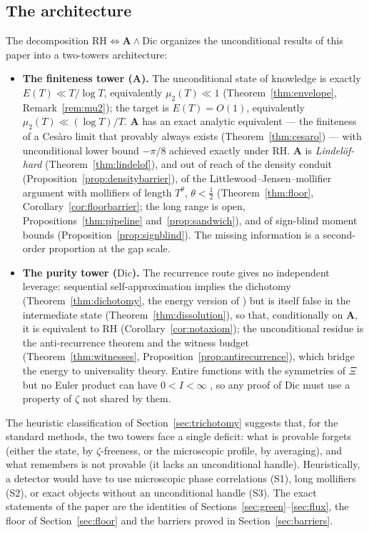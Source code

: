\documentclass[11pt]{amsart}
\theoremstyle{plain}
\theoremstyle{definition}
\theoremstyle{remark}
\newcommand{\RH}{\mathrm{RH}}
\newcommand{\Dic}{\mathrm{Dic}}
\newcommand{\Aax}{\mathbf{A}}
\begin{document}
\subsection{The architecture}

The decomposition $\RH\iff\Aax\wedge\Dic$ organizes the unconditional results of this paper into a two-towers architecture:

\begin{itemize}
\item \textbf{The finiteness tower ($\Aax$).} The unconditional state of knowledge is exactly $E(T)\ll T/\log T$, equivalently $\mu_2(T)\ll1$ (Theorem~\ref{thm:envelope}, Remark~\ref{rem:mu2}); the target is $E(T)=O(1)$, equivalently $\mu_2(T)\ll(\log T)/T$. $\Aax$ has an exact analytic equivalent --- the finiteness of a Ces\`aro limit that provably always exists (Theorem~\ref{thm:cesaro}) --- with unconditional lower bound $-\pi/8$ achieved exactly under $\RH$. $\Aax$ is \emph{Lindel\"of-hard} (Theorem~\ref{thm:lindelof}), and out of reach of the density conduit (Proposition~\ref{prop:densitybarrier}), of the Littlewood--Jensen--mollifier argument with mollifiers of length $T^\theta$, $\theta<\tfrac12$ (Theorem~\ref{thm:floor}, Corollary~\ref{cor:floorbarrier}; the long range is open, Propositions~\ref{thm:pipeline} and~\ref{prop:sandwich}), and of sign-blind moment bounds (Proposition~\ref{prop:signblind}). The missing information is a second-order proportion at the gap scale.
\item \textbf{The purity tower ($\Dic$).} The recurrence route gives no independent leverage: sequential self-approximation implies the dichotomy (Theorem~\ref{thm:dichotomy}, the energy version of \cite[Thm.~2.3]{P30}) but is itself false in the intermediate state (Theorem~\ref{thm:dissolution}), so that, conditionally on $\Aax$, it is equivalent to $\RH$ (Corollary~\ref{cor:notaxiom}); the unconditional residue is the anti-recurrence theorem and the witness budget (Theorem~\ref{thm:witnesses}, Proposition~\ref{prop:antirecurrence}), which bridge the energy to universality theory. Entire functions with the symmetries of $\Xi$ but no Euler product can have $0<I<\infty$ \cite[\S2.3]{P30}, so any proof of $\Dic$ must use a property of $\zeta$ not shared by them.
\end{itemize}

The heuristic classification of Section~\ref{sec:trichotomy} suggests that, for the standard methods, the two towers face a single deficit: what is provable forgets (either the state, by $\zeta$-freeness, or the microscopic profile, by averaging), and what remembers is not provable (it lacks an unconditional handle). Heuristically, a detector would have to use microscopic phase correlations (S1), long mollifiers (S2), or exact objects without an unconditional handle (S3). The exact statements of the paper are the identities of Sections~\ref{sec:green}--\ref{sec:flux}, the floor of Section~\ref{sec:floor} and the barriers proved in Section~\ref{sec:barriers}.
\end{document}
